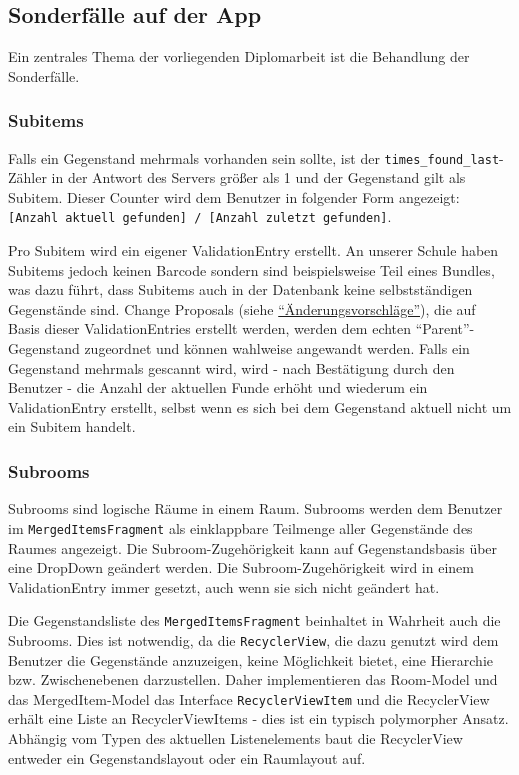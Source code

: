 \hypertarget{sonderfuxe4lle-auf-der-app}{%
\subsection{Sonderfälle auf der App}\label{sonderfuxe4lle-auf-der-app}}

Ein zentrales Thema der vorliegenden Diplomarbeit ist die Behandlung der
Sonderfälle.

\hypertarget{subitems}{%
\subsubsection{Subitems}\label{subitems}}

Falls ein Gegenstand mehrmals vorhanden sein sollte, ist der
\texttt{times\_found\_last}-Zähler in der Antwort des Servers größer als
1 und der Gegenstand gilt als Subitem. Dieser Counter wird dem Benutzer
in folgender Form angezeigt:
\texttt{{[}Anzahl\ aktuell\ gefunden{]}\ /\ {[}Anzahl\ zuletzt\ gefunden{]}}.

Pro Subitem wird ein eigener ValidationEntry erstellt. An unserer Schule
haben Subitems jedoch keinen Barcode sondern sind beispielsweise Teil
eines Bundles, was dazu führt, dass Subitems auch in der Datenbank keine
selbstständigen Gegenstände sind. Change Proposals (siehe
\protect\hyperlink{uxe4nderungsvorschluxe4ge}{``Änderungsvorschläge''}),
die auf Basis dieser ValidationEntries erstellt werden, werden dem
echten ``Parent''-Gegenstand zugeordnet und können wahlweise angewandt
werden. Falls ein Gegenstand mehrmals gescannt wird, wird - nach
Bestätigung durch den Benutzer - die Anzahl der aktuellen Funde erhöht
und wiederum ein ValidationEntry erstellt, selbst wenn es sich bei dem
Gegenstand aktuell nicht um ein Subitem handelt.

\hypertarget{subrooms}{%
\subsubsection{Subrooms}\label{subrooms}}

Subrooms sind logische Räume in einem Raum. Subrooms werden dem Benutzer
im \texttt{MergedItemsFragment} als einklappbare Teilmenge aller
Gegenstände des Raumes angezeigt. Die Subroom-Zugehörigkeit kann auf
Gegenstandsbasis über eine DropDown geändert werden. Die
Subroom-Zugehörigkeit wird in einem ValidationEntry immer gesetzt, auch
wenn sie sich nicht geändert hat.

Die Gegenstandsliste des \texttt{MergedItemsFragment} beinhaltet in
Wahrheit auch die Subrooms. Dies ist notwendig, da die
\texttt{RecyclerView}, die dazu genutzt wird dem Benutzer die
Gegenstände anzuzeigen, keine Möglichkeit bietet, eine Hierarchie bzw.
Zwischenebenen darzustellen. Daher implementieren das Room-Model und das
MergedItem-Model das Interface \texttt{RecyclerViewItem} und die
RecyclerView erhält eine Liste an RecyclerViewItems - dies ist ein
typisch polymorpher Ansatz. Abhängig vom Typen des aktuellen
Listenelements baut die RecyclerView entweder ein Gegenstandslayout oder
ein Raumlayout auf.

